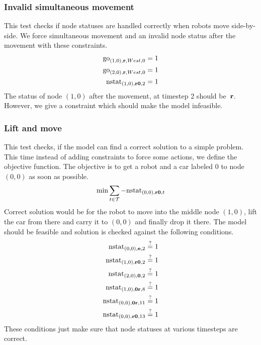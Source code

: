 \subsubsection{Invalid simultaneous movement}
This test checks if node statuses are handled correctly when robots move
side-by-side.
We force simultaneous movement and an invalid node status after the movement
with these constraints.
\begin{align}
    \mathrm{go}_{(1,0),\text{\bf r},West,0} &= 1\\
    \mathrm{go}_{(2,0),\text{\bf r},West,0} &= 1\\
    \mathrm{nstat}_{(1,0),\text{\bf r0},2} &= 1
\end{align}
The status of node $(1,0)$ after the movement, at timestep 2 should
be~$\text{\bf r}$. However, we give a constraint which should make the model
infeasible.
\subsubsection{Lift and move}
This test checks, if the model can find a correct solution to a simple problem.
This time instead of adding constraints to force some actions, we define the
objective function. The objective is to get a robot and a car labeled 0 to node
$(0,0)$ as soon as possible.
\begin{align}
    \min \sum_{t \in \mathcal{T}} -\mathrm{nstat}_{(0,0), \text{\bf r0}, t}
\end{align}
Correct solution would be for the robot to move into the middle node $(1,0)$,
lift the car from there and carry it to $(0,0)$ and finally drop it there. The
model should be feasible and solution is checked against the following
conditions.
\begin{align}
    \mathrm{nstat}_{(0,0), \text{\bf e}, 2} &\overset{?}{=} 1\\
    \mathrm{nstat}_{(1,0), \text{\bf r0}, 2} &\overset{?}{=} 1\\
    \mathrm{nstat}_{(2,0), \text{\bf 0}, 2} &\overset{?}{=} 1\\
    \mathrm{nstat}_{(1,0), \text{\bf 0r}, 8} &\overset{?}{=} 1\\
    \mathrm{nstat}_{(0,0), \text{\bf 0r}, 11} &\overset{?}{=} 1\\
    \mathrm{nstat}_{(0,0), \text{\bf r0}, 13} &\overset{?}{=} 1
\end{align}
These conditions just make sure that node statuses at various timesteps are
correct.
